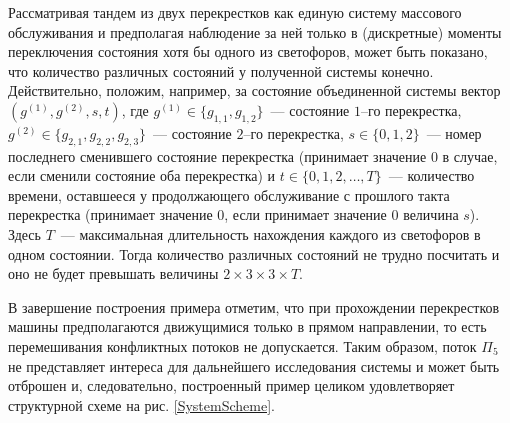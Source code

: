 \documentclass[a4paper,12pt,russian]{extarticle}
\begin{document}
Рассматривая тандем из двух перекрестков как единую систему массового обслуживания и предполагая наблюдение за ней только в (дискретные) моменты переключения состояния хотя бы одного из светофоров, может быть показано, что количество различных состояний у полученной системы конечно. Действительно, положим, например, за состояние объединенной системы вектор $(g^{(1)},g^{(2)}, s, t)$, где $g^{(1)}\in \{g_{1,1},g_{1,2}\}$~--- состояние $1$--го перекрестка, $g^{(2)}\in \{g_{2,1},g_{2,2},g_{2,3}\}$~--- состояние $2$--го перекрестка, $s \in \{0, 1, 2\}$~--- номер последнего сменившего состояние перекрестка (принимает значение $0$ в случае, если сменили состояние оба перекрестка) и $t \in \{0, 1, 2, \ldots, T\}$~--- количество времени, оставшееся у продолжающего обслуживание с прошлого такта перекрестка (принимает значение $0$, если принимает значение $0$ величина $s$). Здесь $T$~--- максимальная длительность нахождения каждого из светофоров в одном состоянии. Тогда количество различных состояний не трудно посчитать и оно не будет превышать величины  $2\times 3 \times 3 \times T$.

В завершение построения примера отметим, что при прохождении перекрестков машины предполагаются движущимися только в прямом направлении, то есть перемешивания конфликтных потоков не допускается. Таким образом, поток $\Pi_5$ не представляет интереса для дальнейшего исследования системы и может быть отброшен и, следовательно, построенный пример целиком удовлетворяет структурной схеме на рис. \ref{SystemScheme}.
\end{document}
